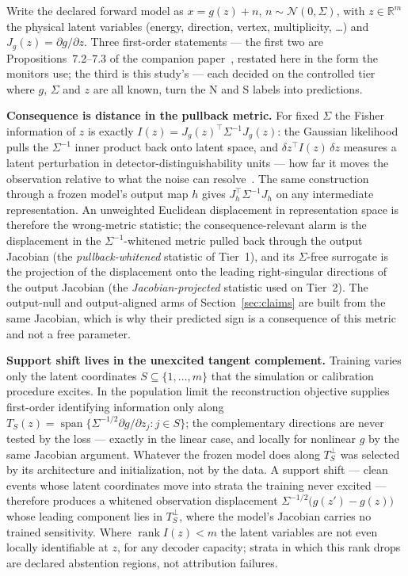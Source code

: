 \documentclass[10pt,twocolumn]{extarticle}
\begin{document}
Write the declared forward model as $x=g(z)+n$, $n\sim\mathcal N(0,\Sigma)$,
with $z\in\mathbb R^m$ the physical latent variables (energy, direction,
vertex, multiplicity, \ldots) and $J_g(z)=\partial g/\partial z$. Three
first-order statements --- the first two are Propositions~7.2--7.3 of the
companion paper~\cite{paper1}, restated here in the form the monitors use;
the third is this study's --- each decided on the controlled tier where $g$,
$\Sigma$ and $z$ are all known, turn the N and S labels into predictions.

\textbf{Consequence is distance in the pullback metric.} For fixed $\Sigma$
the Fisher information of $z$ is exactly
$I(z)=J_g(z)^{\!\top}\Sigma^{-1}J_g(z)$: the Gaussian likelihood pulls the
$\Sigma^{-1}$ inner product back onto latent space, and
$\delta z^{\top}I(z)\,\delta z$ measures a latent perturbation in
detector-distinguishability units --- how far it moves the observation relative
to what the noise can resolve~\cite{paper1}. The same construction through a
frozen model's output map $h$ gives $J_h^{\top}\Sigma^{-1}J_h$ on any
intermediate representation. An unweighted Euclidean displacement in
representation space is therefore the wrong-metric statistic; the
consequence-relevant alarm is the displacement in the $\Sigma^{-1}$-whitened
metric pulled back through the output Jacobian (the \emph{pullback-whitened}
statistic of Tier~1), and its $\Sigma$-free surrogate is the projection of the
displacement onto the leading right-singular directions of the output Jacobian
(the \emph{Jacobian-projected} statistic used on Tier~2). The output-null and
output-aligned arms of Section~\ref{sec:claims} are built from the same
Jacobian, which is why their predicted sign is a consequence of this metric
and not a free parameter.

\textbf{Support shift lives in the unexcited tangent complement.} Training
varies only the latent coordinates $S\subseteq\{1,\dots,m\}$ that the
simulation or calibration procedure excites. In the population limit the
reconstruction objective supplies first-order identifying information only
along $T_S(z)=\operatorname{span}\{\Sigma^{-1/2}\partial g/\partial z_j : j\in S\}$;
the complementary directions are never tested by the loss --- exactly in the
linear case, and locally for nonlinear $g$ by the same Jacobian argument.
Whatever the frozen model does along $T_S^{\perp}$ was selected by its
architecture and initialization, not by the data. A support shift --- clean
events whose latent coordinates move into strata the training never excited
--- therefore produces a whitened observation displacement
$\Sigma^{-1/2}\big(g(z')-g(z)\big)$ whose leading component lies in
$T_S^{\perp}$, where the model's Jacobian carries no trained sensitivity. Where
$\operatorname{rank} I(z)<m$ the latent variables are not even locally
identifiable at $z$, for any decoder capacity; strata in which this rank drops
are declared abstention regions, not attribution failures.
\end{document}
